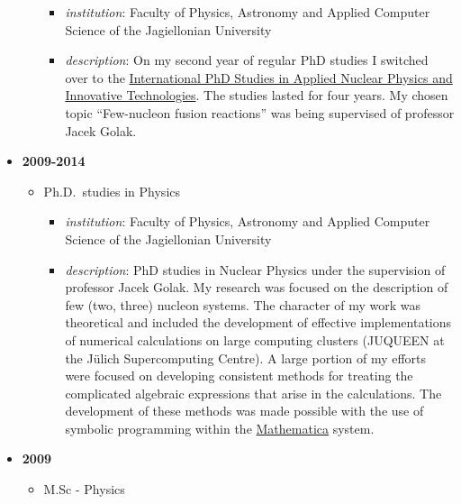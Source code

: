 \documentclass{article}
\providecommand{\tightlist}{%
  \setlength{\itemsep}{0pt}\setlength{\parskip}{0pt}}
\begin{document}
\begin{itemize}
\begin{itemize}
    \begin{itemize}
    \tightlist
    \item
      \emph{institution}: Faculty of Physics, Astronomy and Applied
      Computer Science of the Jagiellonian University
    \item
      \emph{description}: On my second year of regular PhD studies I
      switched over to the
      \href{https://fais.uj.edu.pl/applied-nuclear-physics-and-innovative-technologies}{International
      PhD Studies in Applied Nuclear Physics and Innovative
      Technologies}. The studies lasted for four years. My chosen topic
      ``Few-nucleon fusion reactions'' was being supervised of professor
      Jacek Golak.
    \end{itemize}
  \end{itemize}
\item
  \textbf{2009-2014}

  \begin{itemize}
  \tightlist
  \item
    Ph.D.~studies in Physics

    \begin{itemize}
    \tightlist
    \item
      \emph{institution}: Faculty of Physics, Astronomy and Applied
      Computer Science of the Jagiellonian University
    \item
      \emph{description}: PhD studies in Nuclear Physics under the
      supervision of professor Jacek Golak. My research was focused on
      the description of few (two, three) nucleon systems. The character
      of my work was theoretical and included the development of
      effective implementations of numerical calculations on large
      computing clusters (JUQUEEN at the Jülich Supercomputing Centre).
      A large portion of my efforts were focused on developing
      consistent methods for treating the complicated algebraic
      expressions that arise in the calculations. The development of
      these methods was made possible with the use of symbolic
      programming within the
      \href{https://www.wolfram.com/mathematica/}{Mathematica} system.
    \end{itemize}
  \end{itemize}
\item
  \textbf{2009}

  \begin{itemize}
  \tightlist
  \item
    M.Sc - Physics


\end{itemize}
\end{itemize}
\end{document}
